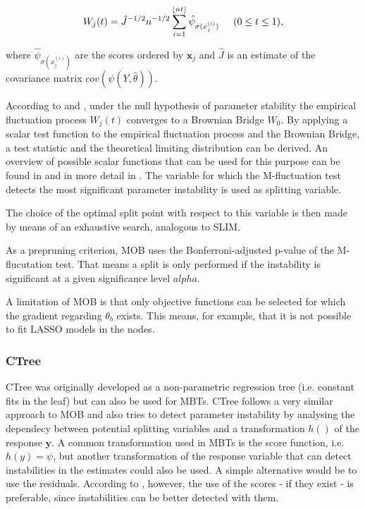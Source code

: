\begin{align}\label{align:W_j}
    W_{j}(t) = \hat{J}^{-1/2}n^{-1/2}\sum_{i = 1}^{\lfloor nt \rfloor} \hat{\psi}_{\sigma(x_{j}^{(i)})} \hspace{0.5cm} (0 \leq t \leq 1), 
\end{align}

where $\hat{\psi}_{\sigma(x_{j}^{(i)})}$ are the scores ordered by $\mathbf{x}_{j}$ and $\hat{J}$ is an estimate of the covariance matrix $cov(\psi(Y, \hat{\theta}))$. \citep{Zeileis.2008}




According to \citet{Zeileis.2008} and \citet{Zeileis.2007}, under the null hypothesis of parameter stability the empirical fluctuation process $W_j(t)$ converges to a Brownian Bridge $W_0$. By applying a scalar test function to the empirical fluctuation process and the Brownian Bridge, a test statistic and the theoretical limiting distribution can be derived. An overview of possible scalar functions that can be used for this purpose can be found in \citep{Zeileis.2008} and in more detail in \citep{Zeileis.2007}.
The variable for which the M-fluctuation test detects the most significant parameter instability is used as splitting variable. 

The choice of the optimal split point with respect to this variable is then made by means of an exhaustive search, analogous to SLIM.

As a prepruning criterion, MOB uses the Bonferroni-adjusted p-value of the M-flucutation test. That means a split is only performed if the instability is significant at a given significance level $alpha$.


A limitation of MOB is that only objective functions can be selected for which the gradient regarding $\theta_b$  exists. This means, for example, that it is not possible to fit LASSO models in the nodes.




\subsubsection{CTree}
CTree was originally developed as a non-parametric regression tree (i.e. constant fits in the leaf) but can also be used for MBTs.
CTree follows a very similar approach to MOB and also tries to detect parameter instability by analysing the dependecy between potential splitting variables and a transformation $h()$ of the response $\textbf{y}$.
A common transformation used in MBTs is the score function, i.e. $h(y) = \psi$, but another transformation of the response variable that can detect instabilities in the estimates could also be used. A simple alternative would be to use the residuals. According to \citep{Schlosser.2019}, however, the use of the scores - if they exist - is preferable, since instabilities can be better detected with them.


